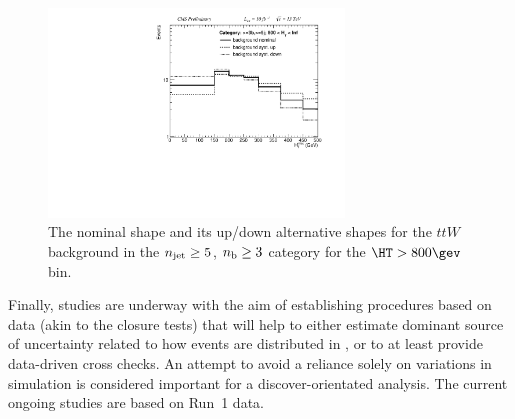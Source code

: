 \begin{figure}[]
  \centering
  \includegraphics[width=0.7\textwidth]{figures/mhtShapeSyst/MHTShapeSyst_ge3b_ge5j_800_Inf.pdf}
  \caption{\label{fig:mht-shape-syst-toy} 
    The nominal \mht shape and its up/down alternative shapes for the $ttW$ background in the $\njet \geq5$, $\nb \geq 3$
    category for the $\HT > 800 \gev$ bin.
  }
\end{figure}

Finally, studies are underway with the aim of establishing procedures
based on data (akin to the closure tests) that will help to either
estimate dominant source of uncertainty related to how events are
distributed in \mht, or to at least provide data-driven cross checks.
An attempt to avoid a reliance solely on variations in simulation is
considered important for a discover-orientated analysis. The current
ongoing studies are based on Run~1 data.

